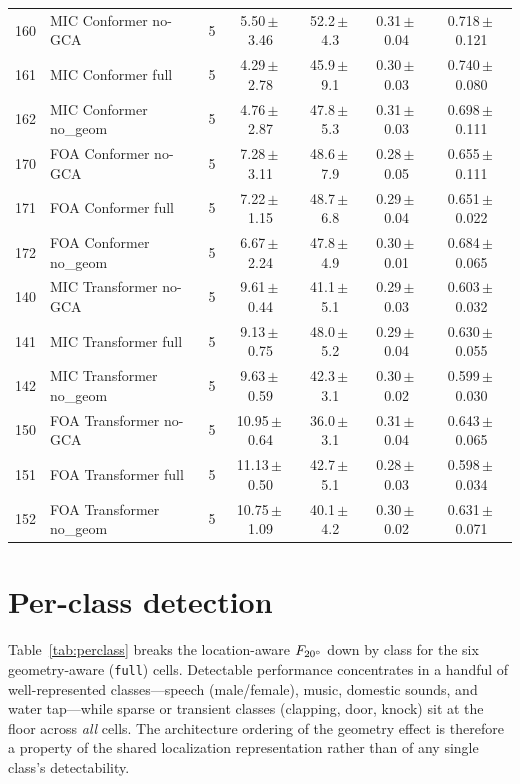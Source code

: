 \begin{table}[t]
\begin{tabular}{llccccc}
\midrule
160 & MIC Conformer no-GCA  & 5 & 5.50\,$\pm$\,3.46 & 52.2\,$\pm$\,4.3 & 0.31\,$\pm$\,0.04 & 0.718\,$\pm$\,0.121 \\
161 & MIC Conformer full    & 5 & 4.29\,$\pm$\,2.78 & 45.9\,$\pm$\,9.1 & 0.30\,$\pm$\,0.03 & 0.740\,$\pm$\,0.080 \\
162 & MIC Conformer no\_geom & 5 & 4.76\,$\pm$\,2.87 & 47.8\,$\pm$\,5.3 & 0.31\,$\pm$\,0.03 & 0.698\,$\pm$\,0.111 \\
170 & FOA Conformer no-GCA  & 5 & 7.28\,$\pm$\,3.11 & 48.6\,$\pm$\,7.9 & 0.28\,$\pm$\,0.05 & 0.655\,$\pm$\,0.111 \\
171 & FOA Conformer full    & 5 & 7.22\,$\pm$\,1.15 & 48.7\,$\pm$\,6.8 & 0.29\,$\pm$\,0.04 & 0.651\,$\pm$\,0.022 \\
172 & FOA Conformer no\_geom & 5 & 6.67\,$\pm$\,2.24 & 47.8\,$\pm$\,4.9 & 0.30\,$\pm$\,0.01 & 0.684\,$\pm$\,0.065 \\
\midrule
140 & MIC Transformer no-GCA  & 5 & 9.61\,$\pm$\,0.44 & 41.1\,$\pm$\,5.1 & 0.29\,$\pm$\,0.03 & 0.603\,$\pm$\,0.032 \\
141 & MIC Transformer full    & 5 & 9.13\,$\pm$\,0.75 & 48.0\,$\pm$\,5.2 & 0.29\,$\pm$\,0.04 & 0.630\,$\pm$\,0.055 \\
142 & MIC Transformer no\_geom & 5 & 9.63\,$\pm$\,0.59 & 42.3\,$\pm$\,3.1 & 0.30\,$\pm$\,0.02 & 0.599\,$\pm$\,0.030 \\
150 & FOA Transformer no-GCA  & 5 & 10.95\,$\pm$\,0.64 & 36.0\,$\pm$\,3.1 & 0.31\,$\pm$\,0.04 & 0.643\,$\pm$\,0.065 \\
151 & FOA Transformer full    & 5 & 11.13\,$\pm$\,0.50 & 42.7\,$\pm$\,5.1 & 0.28\,$\pm$\,0.03 & 0.598\,$\pm$\,0.034 \\
152 & FOA Transformer no\_geom & 5 & 10.75\,$\pm$\,1.09 & 40.1\,$\pm$\,4.2 & 0.30\,$\pm$\,0.02 & 0.631\,$\pm$\,0.071 \\
\bottomrule
\end{tabular}
\end{table}

\section{Per-class detection}
\label{sec:appendix_perclass}
Table~\ref{tab:perclass} breaks the location-aware $F_{20^\circ}$ down by class
for the six geometry-aware (\texttt{full}) cells. Detectable performance
concentrates in a handful of well-represented classes---speech (male/female),
music, domestic sounds, and water tap---while sparse or transient classes
(clapping, door, knock) sit at the floor across \emph{all} cells. The
architecture ordering of the geometry effect is therefore a property of the
shared localization representation rather than of any single class's
detectability.


